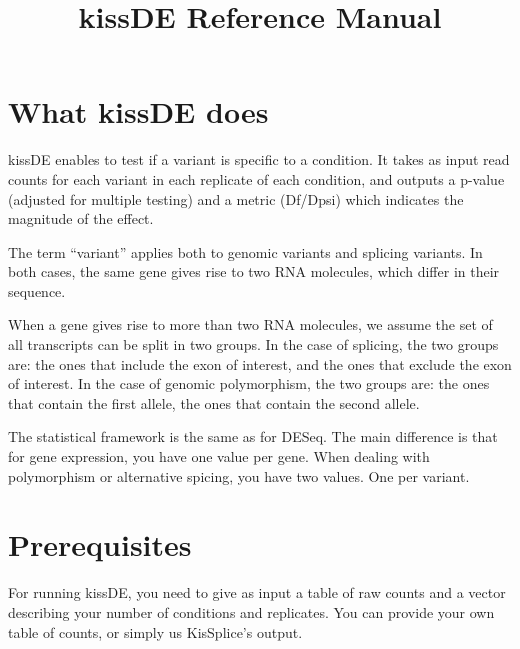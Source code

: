 \documentclass[a4paper,10pt]{article}
\title{kissDE Reference Manual}
\author{}
\begin{document}
\maketitle

\section{What kissDE does}
kissDE enables to test if a variant is specific to a condition.
It takes as input read counts for each variant in each replicate of each condition, and outputs a p-value (adjusted for multiple testing) and a metric (Df/Dpsi) which indicates the magnitude of the effect.

The term ``variant'' applies both to genomic variants and splicing variants.
In both cases, the same gene gives rise to two RNA molecules, which differ in their sequence.

When a gene gives rise to more than two RNA molecules, we assume the set of all transcripts can be split in two groups.
In the case of splicing, the two groups are: the ones that include the exon of interest, and the ones that exclude the exon of interest.
In the case of genomic polymorphism, the two groups are: the ones that contain the first allele, the ones that contain the second allele.

The statistical framework is the same as for DESeq.
The main difference is that for gene expression, you have one value per gene. 
When dealing with polymorphism or alternative spicing, you have two values. One per variant.



\section{Prerequisites}
For running kissDE, you need to give as input a table of raw counts and a vector describing your number of conditions and replicates.
You can provide your own table of counts, or simply us KisSplice's output.
\end{document}
